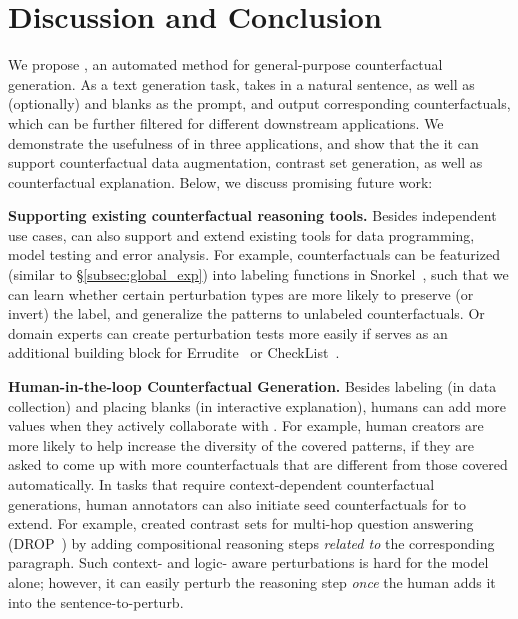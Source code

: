 \section{Discussion and Conclusion}
\label{sec:discuss}

We propose \sysname, an automated method for general-purpose counterfactual generation. 
As a text generation task, \sysname takes in a natural sentence, as well as (optionally) \tagstrs and blanks as the prompt, and output corresponding counterfactuals, which can be further filtered for different downstream applications. 
We demonstrate the usefulness of \sysname in three applications, and show that the it can support counterfactual data augmentation, contrast set generation, as well as counterfactual explanation.
Below, we discuss promising future work:

\textbf{Supporting existing counterfactual reasoning tools.}
Besides independent use cases, \sysname can also support and extend existing tools for data programming, model testing and error analysis.
For example, counterfactuals can be featurized (similar to \S\ref{subsec:global_exp}) into labeling functions in Snorkel~\cite{ratner2017snorkel}, such that we can learn whether certain perturbation types are more likely to preserve (or invert) the label, and generalize the patterns to unlabeled counterfactuals.
Or domain experts can create perturbation tests more easily if \sysname serves as an additional building block for Errudite~\cite{wu2019errudite} or CheckList~\cite{checklist:acl20}.


\textbf{Human-in-the-loop Counterfactual Generation.}
Besides labeling (in data collection) and placing blanks (in interactive explanation), humans can add more values when they actively collaborate with \sysname.
For example, human creators are more likely to help increase the diversity of the covered patterns, if they are asked to come up with more counterfactuals that are different from those covered automatically.
In tasks that require context-dependent counterfactual generations, human annotators can also initiate seed counterfactuals for \sysname to extend.
For example, \citet{gardner2020contrast} created contrast sets for multi-hop question answering (DROP~\cite{Dua2019DROP}) by adding compositional reasoning steps \emph{related to} the corresponding paragraph.
Such context- and logic- aware perturbations is hard for the model alone; however, it can easily perturb the reasoning step \emph{once} the human adds it into the sentence-to-perturb.

